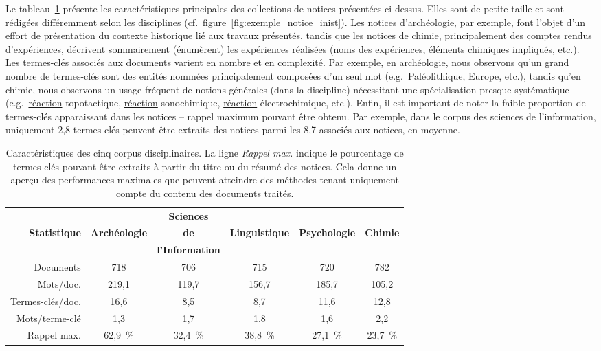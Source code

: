    Le tableau~\ref{tab:statistiques_des_corpus} présente les caractéristiques
    principales des collections de notices présentées ci-dessus. Elles sont de
    petite taille et sont rédigées différemment selon les disciplines
    (cf.~figure~\ref{fig:exemple_notice_inist}). Les notices d'archéologie, par
    exemple, font l'objet d'un effort de présentation du contexte historique lié
    aux travaux présentés, tandis que les notices de chimie, principalement des
    comptes rendus d'expériences, décrivent sommairement (énumèrent) les
    expériences réalisées (noms des expériences, éléments chimiques impliqués,
    etc.). Les termes-clés associés aux documents varient en nombre et en
    complexité. Par exemple, en archéologie, nous observons qu'un grand nombre
    de termes-clés sont des entités nommées principalement composées d'un seul
    mot (e.g.~\og{}Paléolithique\fg{}, \og{}Europe\fg{}, etc.), tandis qu'en
    chimie, nous observons un usage fréquent de notions générales (dans la
    discipline) nécessitant une spécialisation presque systématique
    (e.g.~\og{}\underline{réaction} topotactique\fg{}, \og{}\underline{réaction}
    sonochimique\fg{}, \og{}\underline{réaction} électrochimique\fg{}, etc.).
    Enfin, il est important de noter la faible proportion de termes-clés
    apparaissant dans les notices -- rappel maximum pouvant être obtenu. Par
    exemple, dans le corpus des sciences de l'information, uniquement 2,8
    termes-clés peuvent être extraits des notices parmi les 8,7 associés aux
    notices, en moyenne.

    \begin{table}
      \centering
      \begin{tabular}{@{~}r|c@{~~}c@{~~}c@{~~}c@{~~}c@{~}}
        \toprule
        & & \textbf{Sciences} & & &\\ \textbf{Statistique} & \textbf{Archéologie} & \textbf{de} & \textbf{Linguistique} & \textbf{Psychologie} & \textbf{Chimie}\\ & & \textbf{l'Information} & & &\\
        \hline
        Documents & 718 & 706 & 715 & 720 & 782\\
        Mots/doc. & 219,1 & 119,7 & 156,7 & 185,7 & 105,2\\
        Termes-clés/doc. & 16,6 & 8,5 & 8,7 & 11,6 & 12,8\\
        Mots/terme-clé & 1,3 & 1,7 & 1,8 & 1,6 & 2,2\\
        Rappel max. & 62,9~\% & 32,4~\% & 38,8~\% & 27,1~\% & 23,7~\%\\
        \bottomrule
      \end{tabular}
      \caption{Caractéristiques des cinq corpus disciplinaires. La ligne
               \textit{Rappel max.} indique le pourcentage de termes-clés
               pouvant être extraits à partir du titre ou du résumé des notices.
               Cela donne un aperçu des performances maximales que peuvent
               atteindre des méthodes tenant uniquement compte du contenu des
               documents traités.
               \label{tab:statistiques_des_corpus}}
    \end{table}

